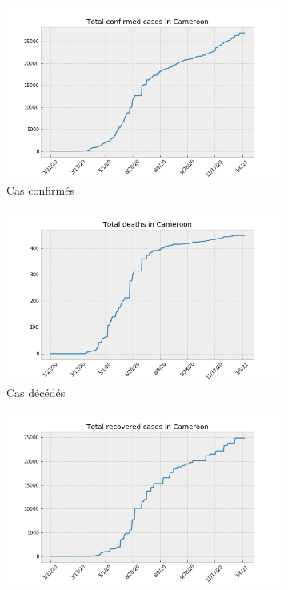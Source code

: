 \documentclass[
  french,
	10pt, %
]{fphw}
\begin{document}
\begin{figure}[H]
	\centering
	\begin{subfigure}{0.32\textwidth}
		\centering
		\includegraphics[width=\textwidth]{Confirmed.png}
	  \caption{Cas confirmés}
  \label{fig:confirmed}
	\end{subfigure}
	\begin{subfigure}{0.32\textwidth}
		\centering
		\includegraphics[width=\textwidth]{Deaths.png}
	  \caption{Cas décédés}
  \label{fig:deaths}
  \end{subfigure}
	\begin{subfigure}{0.32\textwidth}
		\centering
		\includegraphics[width=\textwidth]{Recovered.png}

\end{subfigure}
\end{figure}
\end{document}
